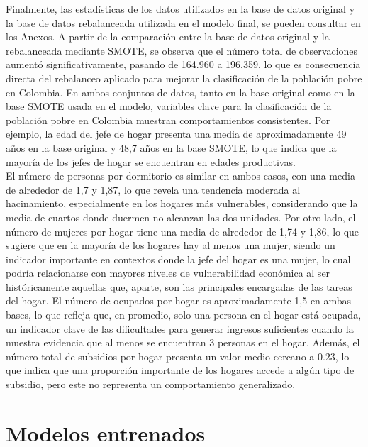 \documentclass[a4paper]{article}
\theoremstyle{remark}
\theoremstyle{definition}
\begin{document}
 Finalmente, las estadísticas de los datos utilizados en la base de datos original y la base de datos rebalanceada utilizada en el modelo final, se pueden consultar en los Anexos. A partir de la comparación entre la base de datos original y la rebalanceada mediante SMOTE, se observa que el número total de observaciones aumentó significativamente, pasando de 164.960 a 196.359, lo que es consecuencia directa del rebalanceo aplicado para mejorar la clasificación de la población pobre en Colombia. En ambos conjuntos de datos, tanto en la base original como en la base SMOTE usada en el modelo, variables clave para la clasificación de la población pobre en Colombia muestran comportamientos consistentes. Por ejemplo, la edad del jefe de hogar presenta una media de aproximadamente 49 años en la base original y 48,7 años en la base SMOTE, lo que indica que la mayoría de los jefes de hogar se encuentran en edades productivas.\\
 
 El número de personas por dormitorio es similar en ambos casos, con una media de alrededor de 1,7 y 1,87, lo que revela una tendencia moderada al hacinamiento, especialmente en los hogares más vulnerables, considerando que la media de cuartos donde duermen no alcanzan las dos unidades. Por otro lado, el número de mujeres por hogar tiene una media de alrededor de 1,74 y 1,86, lo que sugiere que en la mayoría de los hogares hay al menos una mujer, siendo un indicador importante en contextos donde la jefe del hogar es una mujer, lo cual podría relacionarse con mayores niveles de vulnerabilidad económica al ser históricamente aquellas que, aparte, son las principales encargadas de las tareas del hogar. El número de ocupados por hogar es aproximadamente 1,5 en ambas bases, lo que refleja que, en promedio, solo una persona en el hogar está ocupada, un indicador clave de las dificultades para generar ingresos suficientes cuando la muestra evidencia que al menos se encuentran 3 personas en el hogar. Además, el número total de subsidios por hogar presenta un valor medio cercano a 0.23, lo que indica que una proporción importante de los hogares accede a algún tipo de subsidio, pero este no representa un comportamiento generalizado.


\section{Modelos entrenados}
\end{document}
